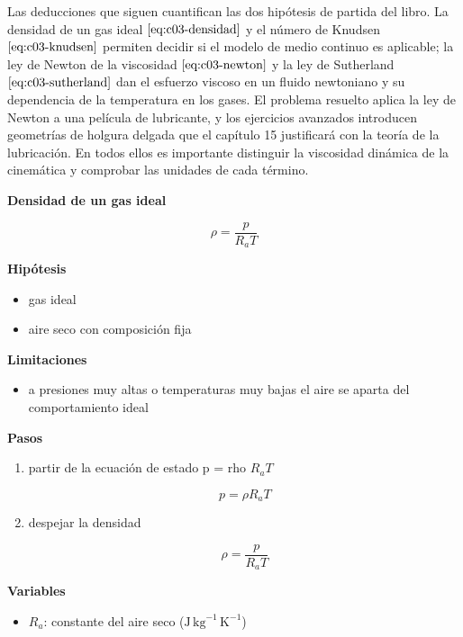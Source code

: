 \documentclass[10pt,openany]{book}
\begin{document}
Las deducciones que siguen cuantifican las dos hipótesis de partida del libro. La densidad de un gas ideal \(\eqref{eq:c03-densidad}\) y el número de Knudsen \(\eqref{eq:c03-knudsen}\) permiten decidir si el modelo de medio continuo es aplicable; la ley de Newton de la viscosidad \(\eqref{eq:c03-newton}\) y la ley de Sutherland \(\eqref{eq:c03-sutherland}\) dan el esfuerzo viscoso en un fluido newtoniano y su dependencia de la temperatura en los gases. El problema resuelto aplica la ley de Newton a una película de lubricante, y los ejercicios avanzados introducen geometrías de holgura delgada que el capítulo 15 justificará con la teoría de la lubricación. En todos ellos es importante distinguir la viscosidad dinámica de la cinemática y comprobar las unidades de cada término.

\begin{tcolorbox}[title={Desarrollos del modelo}, studiumdef, breakable]

\noindent\textbf{Densidad de un gas ideal}

\begin{equation}
\rho = \frac{p}{R_a T}
\label{eq:c03-gas-ideal}
\end{equation}

\noindent\textbf{Hipótesis}
\begin{itemize}
\item gas ideal
\item aire seco con composición fija
\end{itemize}

\noindent\textbf{Limitaciones}
\begin{itemize}
\item a presiones muy altas o temperaturas muy bajas el aire se aparta del comportamiento ideal
\end{itemize}

\noindent\textbf{Pasos}
\begin{enumerate}
\item
partir de la ecuación de estado p = rho \(R_a T\)

\[
p = \rho R_a T
\]
\item
despejar la densidad

\[
\rho = \frac{p}{R_a T}
\]
\end{enumerate}

\noindent\textbf{Variables}
\begin{itemize}
\item $R_{a}$: constante del aire seco ($\mathrm{J}\,\mathrm{kg}^{-1}\,\mathrm{K}^{-1}$)
\end{itemize}




\end{tcolorbox}
\end{document}
